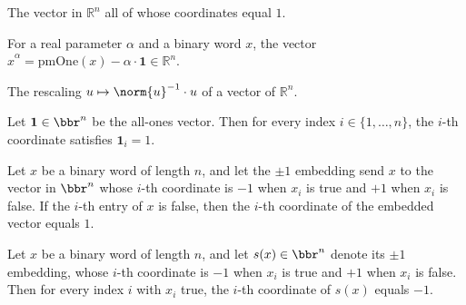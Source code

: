 \begin{definition}
\label{CodingTheory.Johnson.ones}
\leanok
{}
The vector in $\mathbb{R}^n$ all of whose coordinates equal $1$.
\end{definition}

\begin{definition}
\label{CodingTheory.Johnson.shifted}
\leanok
{}
For a real parameter $\alpha$ and a binary word $x$, the vector
$\hat{x}^\alpha = \mathrm{pmOne}(x) - \alpha \cdot \mathbf{1} \in \mathbb{R}^n$.
\end{definition}

\begin{definition}[Normalization]
\label{CodingTheory.Johnson.normalize}
\leanok
{}
The rescaling $u \mapsto \norm{u}^{-1} \cdot u$ of a vector of $\mathbb{R}^n$.
\end{definition}

\begin{lemma}
\label{CodingTheory.Johnson.ones_apply}
\leanok
{}
Let $\mathbf{1} \in \bbr^n$ be the all-ones vector. Then for every index $i \in \{1,
\dots, n\}$, the $i$-th coordinate satisfies $\mathbf{1}_i = 1$.
\end{lemma}

\begin{lemma}
\label{CodingTheory.Johnson.pmOne_apply_false}
\leanok
{}
Let $x$ be a binary word of length $n$, and let the $\pm 1$ embedding send $x$ to the
vector in $\bbr^n$ whose $i$-th coordinate is $-1$ when $x_i$ is true and $+1$ when
$x_i$ is false. If the $i$-th entry of $x$ is false, then the $i$-th coordinate of the
embedded vector equals $1$.
\end{lemma}

\begin{lemma}
\label{CodingTheory.Johnson.pmOne_apply_true}
\leanok
{}
Let $x$ be a binary word of length $n$, and let $s(x) \in \bbr^n$ denote its $\pm1$
embedding, whose $i$-th coordinate is $-1$ when $x_i$ is true and $+1$ when $x_i$ is
false. Then for every index $i$ with $x_i$ true, the $i$-th coordinate of $s(x)$ equals
$-1$.
\end{lemma}

